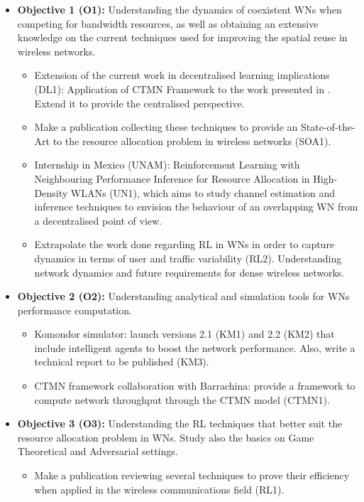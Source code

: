 \documentclass[12pt, a4paper,twoside]{tesi_upf}
\begin{document}
		\begin{itemize}
			\item \textbf{Objective 1 (O1):} Understanding the dynamics of coexistent WNs when competing for bandwidth resources, as well as obtaining an extensive knowledge on the current techniques used for improving the spatial reuse in wireless networks.
			\begin{itemize}
				\item Extension of the current work in decentralised learning implications (DL1): Application of CTMN Framework to the work presented in \cite{wilhelmi2017implications}. Extend it to provide the centralised perspective.
				\item Make a publication collecting these techniques to provide an State-of-the-Art to the resource allocation problem in wireless networks (SOA1).
				\item Internship in Mexico (UNAM): Reinforcement Learning with Neighbouring Performance Inference for Resource Allocation in High-Density WLANs (UN1), which aims to study channel estimation and inference techniques to envision the behaviour of an overlapping WN from a decentralised point of view.
				\item Extrapolate the work done regarding RL in WNs in order to capture dynamics in terms of user and traffic variability (RL2). Understanding network dynamics and future requirements for dense wireless networks.
			\end{itemize}
			\item \textbf{Objective 2 (O2):} Understanding analytical and simulation tools for WNs performance computation.
			\begin{itemize}
				\item Komondor simulator: launch versions 2.1 (KM1) and 2.2 (KM2) that include intelligent agents to boost the network performance. Also, write a technical report to be published (KM3).
				\item CTMN framework collaboration with Barrachina: provide a framework to compute network throughput through the CTMN model (CTMN1).
			\end{itemize}	
			\item \textbf{Objective 3 (O3):} Understanding the RL techniques that better suit the resource allocation problem in WNs. Study also the basics on Game Theoretical and Adversarial settings.
			\begin{itemize}
				\item Make a publication reviewing several techniques to prove their efficiency when applied in the wireless communications field (RL1).

\end{itemize}
\end{itemize}
\end{document}
